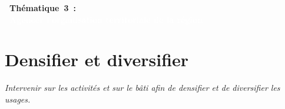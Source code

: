 \documentclass[../main.tex]{subfiles}
\begin{document}
    \newpage

    \vspace{15pt}
    \noindent
    \Large
\textbf{\textcolor{UGEblue}{~Thématique~3~:}}
    \\
\colorbox{UGEblue}{\textbf{\textcolor{white}{~Agencer l'organisation territoriale de la région~}}}
    \vspace{15pt}

    \vspace{15pt}
\section{Densifier et diversifier}

\begin{block}[Intervenir]
    \linespread{0.9}\selectfont %
    \textit{\small{Intervenir sur les activités et sur le bâti afin de densifier et de diversifier les usages.}}
\end{block}
\end{document}
